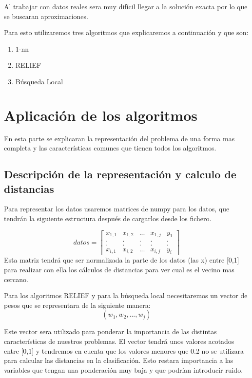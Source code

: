 \documentclass[titlepage]{article}
\begin{document}
	Al trabajar con datos reales sera muy difícil llegar a la solución exacta por lo que se buscaran aproximaciones.
	
	Para esto utilizaremos tres algoritmos que explicaremos a continuación y que son:
	\begin{enumerate}
		\item 1-nn
		\item RELIEF
		\item Búsqueda Local 
	\end{enumerate}
	\newpage
	
	\section{Aplicación de los algoritmos }
	 En esta parte se explicaran la representación del problema de una forma mas completa y las características comunes que tienen todos los algoritmos.
	 
	 \subsection{Descripción de la representación y calculo de distancias}
	 
	 Para representar los datos usaremos matrices de numpy para los datos, que tendrán la siguiente estructura después de cargarlos desde los fichero.
	
	\[
	datos =
	\begin{bmatrix}
	x_{1,1} & x_{1,2} & ... & x_{1,j} & y_1 \\
	. & . & . & . & . \\
	. & . & . & . & .\\
	x_{i,1} & x_{i,2} & ... & x_{i,j} & y_i
	\end{bmatrix}
	\]
	Esta matriz tendrá que ser normalizada la parte de los datos (las x) entre [0,1] para realizar con ella los cálculos de distancias para ver cual es el vecino mas cercano.
	
	Para los algoritmos RELIEF y para la búsqueda local necesitaremos un vector de pesos que se representara de la siguiente manera:
	$$
		(w_1, w_2, ..., w_j)
	$$
	
	Este vector sera utilizado para ponderar la importancia de las distintas características de nuestros problemas. El vector tendrá unos valores acotados entre [0,1] y tendremos en cuenta que los valores menores que 0.2 no se utilizara para calcular las distancias en la clasificación. Esto restara importancia a las variables que tengan una ponderación muy baja y que podrían introducir ruido.
	
\end{document}
